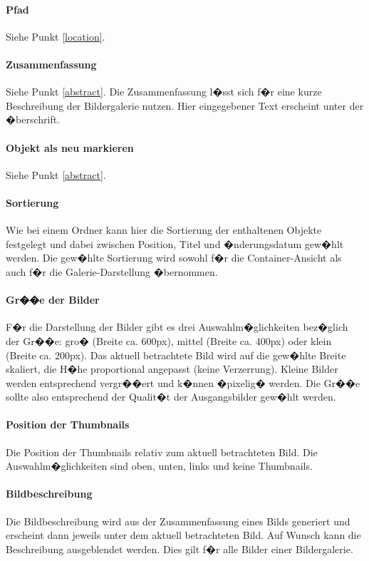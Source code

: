 \paragraph{Pfad}
Siehe Punkt \ref{location}.

\paragraph{Zusammenfassung}
Siehe Punkt \ref{abstract}. Die Zusammenfassung l�sst sich f�r eine kurze Beschreibung der Bildergalerie 
nutzen. Hier eingegebener Text erscheint unter der �berschrift.

\paragraph{Objekt als neu markieren}
Siehe Punkt \ref{abstract}.

\paragraph{Sortierung}
Wie bei einem Ordner kann hier die Sortierung der enthaltenen Objekte festgelegt und dabei zwischen 
Position, Titel und �nderungsdatum gew�hlt werden. Die gew�hlte Sortierung wird sowohl f�r die Container-Ansicht 
als auch f�r die Galerie-Darstellung �bernommen. 

\paragraph{Gr��e der Bilder}
F�r die Darstellung der Bilder gibt es drei Auswahlm�glichkeiten bez�glich der Gr��e: gro� (Breite ca. 600px), mittel (Breite ca. 400px) oder klein (Breite ca. 200px). Das aktuell betrachtete Bild wird auf die gew�hlte Breite skaliert, die H�he proportional angepasst (keine Verzerrung). Kleine Bilder werden entsprechend vergr��ert und k�nnen �pixelig� werden. Die Gr��e sollte also entsprechend der Qualit�t der Ausgangsbilder gew�hlt werden.

\paragraph{Position der Thumbnails}
Die Position der Thumbnails relativ zum aktuell betrachteten Bild. Die Auswahlm�glichkeiten sind oben, unten, links und keine Thumbnails.

\paragraph{Bildbeschreibung}
Die Bildbeschreibung wird aus der Zusammenfassung eines Bilds generiert und erscheint dann jeweils unter dem aktuell betrachteten Bild. Auf Wunsch kann die Beschreibung ausgeblendet werden. Dies gilt f�r alle Bilder einer Bildergalerie.

